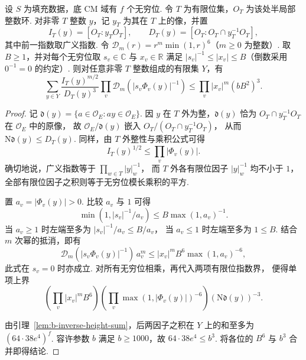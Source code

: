 \begin{lemma}[一般对偶尺度下的频率总和]
\label{lem:b-frequency-sum}
\emitthmsource
设 $S$ 为填充数据，底 CM 域有 $f$ 个无穷位. 令 $T$ 为有限位集，$O_T$ 为该处半局部整数环.
对非零 $T$ 整数 $y$，记 $y_T$ 为其在 $T$ 上的像，并置
\[
 I_T(y)=[O_T:y_TO_T],\qquad
 D_T(y)=[O_T:O_T\cap y_T^{-1}O_T],
\]
其中前一指数取广义指数. 令
$\mathcal D_m(r)=r^m\min(1,r)^6$（$m\ge0$ 为整数）.
取 $B\ge1$，并对每个无穷位取 $s_v\in\mathbb C$ 与 $x_v\in\mathbb R$
满足 $|s_v|^{-1}\le |x_v|\le B$（倒数采用 $0^{-1}=0$ 的约定）.
则对任意非零 $T$ 整数组成的有限集 $Y$，有
\[
 \sum_{y\in Y}\frac{I_T(y)^{m/2}}{D_T(y)^3}
      \prod_v\mathcal D_m\!\left(|s_v\Phi_v(y)|^{-1}\right)
 \le \prod_v |x_v|^m(bB^2)^3 .
\]
\end{lemma}
\begin{proof}
记 $\mathfrak d(y)=\{a\in\mathcal O_E:ay\in\mathcal O_E\}$.
因 $y$ 在 $T$ 外为整，$\mathfrak d(y)$ 恰为
$O_T\cap y_T^{-1}O_T$ 在 $\mathcal O_E$ 中的原像，
故 $\mathcal O_E/\mathfrak d(y)$ 嵌入 $O_T/(O_T\cap y_T^{-1}O_T)$，
从而 $\mathrm N\mathfrak d(y)\le D_T(y)$.
同样，由 $T$ 外整性与乘积公式可得
\[
 I_T(y)^{1/2}\le\prod_v|\Phi_v(y)|.
\]
确切地说，广义指数等于 $\prod_{w\in T}|y|_w^{-1}$，
而 $T$ 外各有限位因子 $|y|_w^{-1}$ 均不小于 $1$，
全部有限位因子之积则等于无穷位模长乘积的平方.

置 $a_v=|\Phi_v(y)|>0$. 比较 $a_v$ 与 $1$ 可得
\[
 \min(1,|s_v|^{-1}/a_v)\le B\max(1,a_v)^{-1}.
\]
当 $a_v\ge1$ 时左端至多为 $|s_v|^{-1}/a_v\le B/a_v$，
当 $a_v\le1$ 时左端至多为 $1\le B$. 结合 $m$ 次幂的抵消，即有
\[
 \mathcal D_m(|s_v\Phi_v(y)|^{-1})\,a_v^m
 \le |x_v|^m B^6\max(1,a_v)^{-6},
\]
此式在 $s_v=0$ 时亦成立. 对所有无穷位相乘，再代入两项有限位指数界，
便得单项上界
\[
  \left(\prod_v |x_v|^m B^6\right)
  \left(\prod_v\max(1,|\Phi_v(y)|)^{-6}\right)
  (\mathrm N\mathfrak d(y))^{-3}.
\]

由引理~\ref{lem:b-inverse-height-sum}，后两因子之积在 $Y$ 上的和至多为 $(64\cdot38e^4)^f$.
容许参数 $b$ 满足 $b\ge1000$，故 $64\cdot38e^4\le b^3$.
将各位的 $B^6$ 与 $b^3$ 合并即得结论.
\end{proof}

